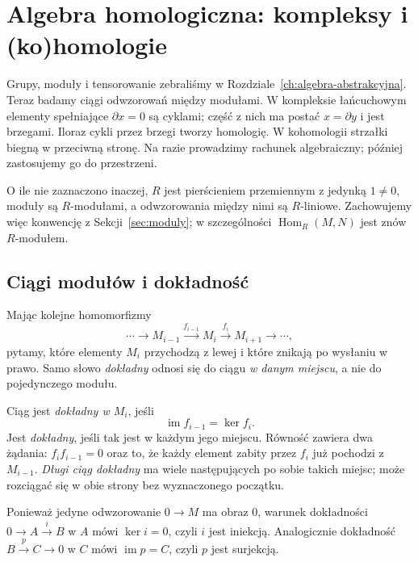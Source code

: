 \chapter{Algebra homologiczna: kompleksy i (ko)homologie}
\label{ch:algebra-homologiczna}

Grupy, moduły i tensorowanie zebraliśmy w
Rozdziale~\ref{ch:algebra-abstrakcyjna}.
Teraz badamy ciągi odwzorowań między modułami.
W kompleksie łańcuchowym elementy spełniające
$\partial x=0$ są cyklami; część z nich ma postać
$x=\partial y$ i jest brzegami. Iloraz cykli
przez brzegi tworzy homologię. W kohomologii
strzałki biegną w przeciwną stronę.
Na razie prowadzimy rachunek algebraiczny;
później zastosujemy go do przestrzeni.

O ile nie zaznaczono inaczej, $R$ jest pierścieniem przemiennym
z jedynką $1\ne0$, moduły są $R$-modułami, a odwzorowania między
nimi są $R$-liniowe. Zachowujemy więc konwencję z
Sekcji~\ref{sec:moduly}; w szczególności
$\operatorname{Hom}_R(M,N)$ jest znów $R$-modułem.

\section{Ciągi modułów i dokładność}
\label{sec:dokladnosc-modulow}

Mając kolejne homomorfizmy
\[
 \cdots\longrightarrow M_{i-1}
 \xrightarrow{f_{i-1}}M_i
 \xrightarrow{f_i}M_{i+1}
 \longrightarrow\cdots,
\]
pytamy, które elementy $M_i$ przychodzą z lewej
i które znikają po wysłaniu w prawo.
Samo słowo \emph{dokładny} odnosi się do
ciągu \emph{w danym miejscu}, a nie do
pojedynczego modułu.

\begin{definicja}
\label{def:ciag-dokladny}
Ciąg jest \emph{dokładny w $M_i$}, jeśli
\[
 \operatorname{im}f_{i-1}=\ker f_i.
\]
Jest \emph{dokładny}, jeśli tak jest
w każdym jego miejscu. Równość zawiera
dwa żądania: $f_i f_{i-1}=0$ oraz to,
że każdy element zabity przez $f_i$
już pochodzi z $M_{i-1}$.
\emph{Długi ciąg dokładny} ma wiele
następujących po sobie takich miejsc;
może rozciągać się w obie strony
bez wyznaczonego początku.
\end{definicja}

Ponieważ jedyne odwzorowanie $0\to M$ ma obraz $0$,
warunek dokładności $0\to A\xrightarrow{i}B$
w $A$ mówi $\ker i=0$, czyli $i$ jest iniekcją.
Analogicznie dokładność
$B\xrightarrow{p}C\to0$ w $C$ mówi
$\operatorname{im}p=C$, czyli $p$ jest surjekcją.

